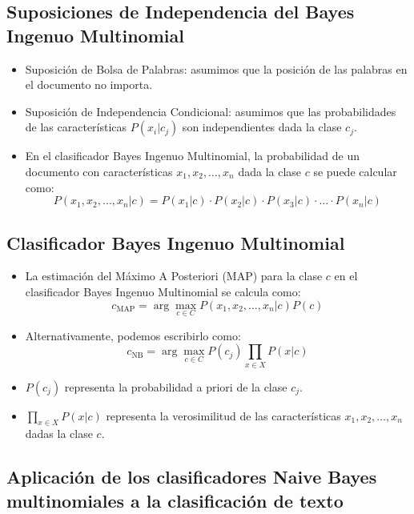 \documentclass[11pt,fleqn]{book} %
\begin{document}
\subsection{Suposiciones de Independencia del Bayes Ingenuo Multinomial}
\begin{itemize}
    \item Suposición de Bolsa de Palabras: asumimos que la posición de las palabras en el documento no importa.
    \item Suposición de Independencia Condicional: asumimos que las probabilidades de las características $P(x_i | c_j)$ son independientes dada la clase $c_j$.
    \item En el clasificador Bayes Ingenuo Multinomial, la probabilidad de un documento con características $x_1, x_2, \ldots, x_n$ dada la clase $c$ se puede calcular como:
    \[
    P(x_1, x_2, \ldots, x_n | c) = P(x_1 | c) \cdot P(x_2 | c) \cdot P(x_3 | c) \cdot \ldots \cdot P(x_n | c)
    \]
\end{itemize}

\subsection{Clasificador Bayes Ingenuo Multinomial}
\begin{itemize}
    \item La estimación del Máximo A Posteriori (MAP) para la clase $c$ en el clasificador Bayes Ingenuo Multinomial se calcula como:
    \[
    c_{\text{MAP}} = \arg\max_{c \in C} P(x_1, x_2, \ldots, x_n | c)P(c)
    \]
    \item Alternativamente, podemos escribirlo como:
    \[
    c_{\text{NB}} = \arg\max_{c \in C} P(c_j) \prod_{x \in X} P(x | c)
    \]
    \item $P(c_j)$ representa la probabilidad a priori de la clase $c_j$.
    \item $\prod_{x \in X} P(x | c)$ representa la verosimilitud de las características $x_1, x_2, \ldots, x_n$ dadas la clase $c$.
\end{itemize}


\subsection{Aplicación de los clasificadores Naive Bayes multinomiales a la clasificación de texto}
\end{document}
